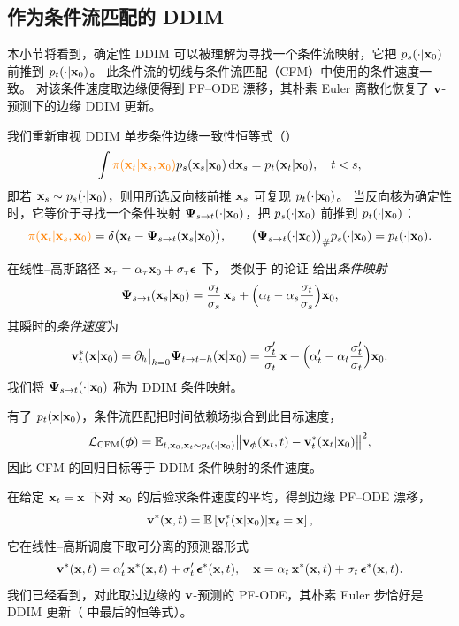 \subsection{作为条件流匹配的 DDIM}\label{subsec:ddim-cfm}
本小节将看到，确定性 DDIM 可以被理解为寻找一个条件流映射，它把 $p_s(\cdot|{\mathbf{x}}_0)$ 前推到 $p_t(\cdot|{\mathbf{x}}_0)$。
此条件流的切线与条件流匹配（CFM）中使用的条件速度一致。
对该条件速度取边缘便得到 PF--ODE 漂移，其朴素 Euler 离散化恢复了 ${\mathbf{v}}$-预测下的边缘 DDIM 更新。

我们重新审视 DDIM 单步条件边缘一致性恒等式（）
\[
\int {\color{orange}\pi({\mathbf{x}}_t|{\mathbf{x}}_s,{\mathbf{x}}_0)} p_s({\mathbf{x}}_s|{\mathbf{x}}_0) \mathop{}\!\mathrm{d} {\mathbf{x}}_s
= p_t({\mathbf{x}}_t|{\mathbf{x}}_0), \quad t<s,
\]
即若 ${\mathbf{x}}_s\sim p_s(\cdot|{\mathbf{x}}_0)$，则用所选反向核前推 ${\mathbf{x}}_s$ 可复现 $p_t(\cdot|{\mathbf{x}}_0)$。
当反向核为确定性时，它等价于寻找一个条件映射
${\bm{\Psi}}_{s\to t}(\cdot|{\mathbf{x}}_0)$，把 $p_s(\cdot|{\mathbf{x}}_0)$ 前推到 $p_t(\cdot|{\mathbf{x}}_0)$：
\[
{\color{orange}\pi({\mathbf{x}}_t|{\mathbf{x}}_s,{\mathbf{x}}_0)}
=\delta \big({\mathbf{x}}_t-{\bm{\Psi}}_{s\to t}({\mathbf{x}}_s|{\mathbf{x}}_0)\big),
\qquad
\bigl({\bm{\Psi}}_{s\to t}(\cdot|{\mathbf{x}}_0)\bigr)_{\#}p_s(\cdot|{\mathbf{x}}_0)=p_t(\cdot|{\mathbf{x}}_0).
\]


在线性--高斯路径 ${\mathbf{x}}_\tau=\alpha_\tau{\mathbf{x}}_0+\sigma_\tau{\bm{\epsilon}}$ 下，
类似于  的论证
给出\textit{条件映射}
\[
{\bm{\Psi}}_{s\to t}({\mathbf{x}}_s|{\mathbf{x}}_0)
=\frac{\sigma_t}{\sigma_s}\,{\mathbf{x}}_s
+\Bigl(\alpha_t-\alpha_s\frac{\sigma_t}{\sigma_s}\Bigr){\mathbf{x}}_0,
\]
其瞬时的\textit{条件速度}为
\[
{\mathbf{v}}_t^{*}({\mathbf{x}}|{\mathbf{x}}_0)
=\partial_h \big|_{h=0}{\bm{\Psi}}_{t\to t+h}({\mathbf{x}}|{\mathbf{x}}_0)
=\frac{\sigma_t'}{\sigma_t}\,{\mathbf{x}}
+\Bigl(\alpha_t'-\alpha_t\frac{\sigma_t'}{\sigma_t}\Bigr){\mathbf{x}}_0.
\]
我们将 ${\bm{\Psi}}_{s\to t}(\cdot|{\mathbf{x}}_0)$ 称为 DDIM 条件映射。

有了 $p_t({\mathbf{x}}|{\mathbf{x}}_0)$，条件流匹配把时间依赖场拟合到此目标速度，
\[
\mathcal L_{\mathrm{CFM}}({\bm{\phi}})
=\mathbb{E}_{t,{\mathbf{x}}_0,{\mathbf{x}}_t\sim p_t(\cdot|{\mathbf{x}}_0)}
\big\|{\mathbf{v}}_{\bm{\phi}}({\mathbf{x}}_t,t)-{\mathbf{v}}_t^{*}({\mathbf{x}}_t|{\mathbf{x}}_0)\big\|^2,
\]
因此 CFM 的回归目标等于 DDIM 条件映射的条件速度。


在给定 ${\mathbf{x}}_t={\mathbf{x}}$ 下对 ${\mathbf{x}}_0$ 的后验求条件速度的平均，得到边缘 PF--ODE 漂移，
\[
{\mathbf{v}}^*({\mathbf{x}},t)=\mathbb{E} \left[{\mathbf{v}}_t^*({\mathbf{x}}| {\mathbf{x}}_0)|{\mathbf{x}}_t={\mathbf{x}}\right],
\]
它在线性--高斯调度下取可分离的预测器形式
\[
{\mathbf{v}}^*({\mathbf{x}},t)=\alpha_t'\,{\mathbf{x}}^*({\mathbf{x}},t)+\sigma_t'\,{\bm{\epsilon}}^*({\mathbf{x}},t),
\quad
{\mathbf{x}}=\alpha_t\,{\mathbf{x}}^*({\mathbf{x}},t)+\sigma_t\,{\bm{\epsilon}}^*({\mathbf{x}},t).
\]
我们已经看到，对此取过边缘的 ${\mathbf{v}}$-预测的 PF-ODE，其朴素 Euler 步恰好是 DDIM 更新（ 中最后的恒等式）。

